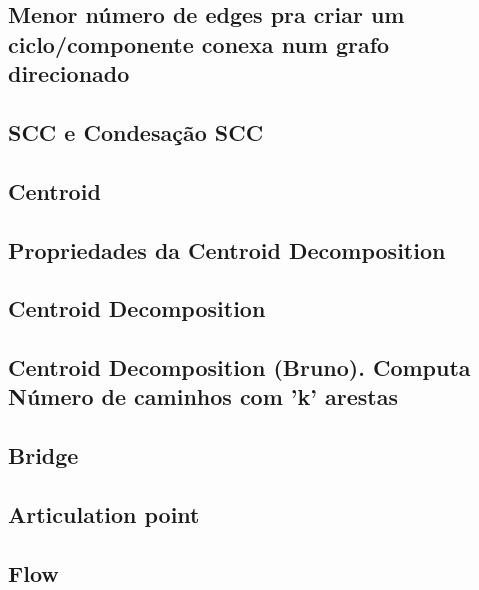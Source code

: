 \subsection{Menor número de edges pra criar um ciclo/componente conexa num grafo direcionado}


\subsection{SCC e Condesação SCC}


\subsection{Centroid}


\subsection{Propriedades da Centroid Decomposition}


\subsection{Centroid Decomposition}


\subsection{Centroid Decomposition (Bruno). Computa Número de caminhos com 'k' arestas}


\subsection{Bridge}


\subsection{Articulation point}


\subsection{Flow}

